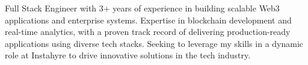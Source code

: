 Full Stack Engineer with 3+ years of experience in building scalable Web3 applications and enterprise systems. Expertise in blockchain development and real-time analytics, with a proven track record of delivering production-ready applications using diverse tech stacks. Seeking to leverage my skills in a dynamic role at Instahyre to drive innovative solutions in the tech industry.